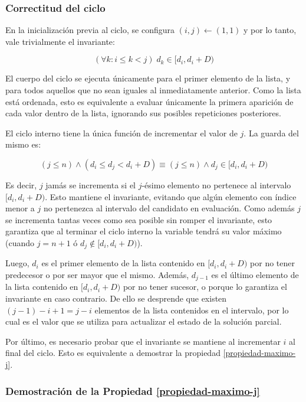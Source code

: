 \subsubsection{Correctitud del ciclo}

En la inicialización previa al ciclo, se configura $(i, j) \leftarrow (1, 1)$ y por lo tanto, vale trivialmente el invariante:

$$(\forall k: i \leq k < j)\;d_k \in [d_i, d_i + D)$$

El cuerpo del ciclo se ejecuta únicamente para el primer elemento de la lista, y para todos aquellos que no sean iguales al inmediatamente anterior. Como la lista está ordenada, esto es equivalente a evaluar únicamente la primera aparición de cada valor dentro de la lista, ignorando sus posibles repeticiones posteriores.

El ciclo interno tiene la única función de incrementar el valor de $j$. La guarda del mismo es:

$$(j \leq n) \land (d_i \leq d_j < d_i + D) \equiv (j \leq n) \land d_j \in [d_i, d_i + D)$$

Es decir, $j$ jamás se incrementa si el $j$-ésimo elemento no pertenece al intervalo $[d_i, d_i + D)$. Esto mantiene el invariante, evitando que algún elemento con índice menor a $j$ no pertenezca al intervalo del candidato en evaluación. Como además $j$ se incrementa tantas veces como sea posible sin romper el invariante, esto garantiza que al terminar el ciclo interno la variable tendrá su valor máximo (cuando $j = n + 1$ ó $d_j \notin [d_i, d_i + D)$).

Luego, $d_i$ es el primer elemento de la lista contenido en $[d_i, d_i + D)$ por no tener predecesor o por ser mayor que el mismo. Además, $d_{j-1}$ es el último elemento de la lista contenido en $[d_i, d_i + D)$ por no tener sucesor, o porque lo garantiza el invariante en caso contrario. De ello se desprende que existen $(j - 1) - i + 1 = j - i$ elementos de la lista contenidos en el intervalo, por lo cual es el valor que se utiliza para actualizar el estado de la solución parcial.

Por último, es necesario probar que el invariante se mantiene al incrementar $i$ al final del ciclo. Esto es equivalente a demostrar la propiedad \ref{propiedad-maximo-j}.

\subsubsection{Demostración de la Propiedad \ref{propiedad-maximo-j}}

